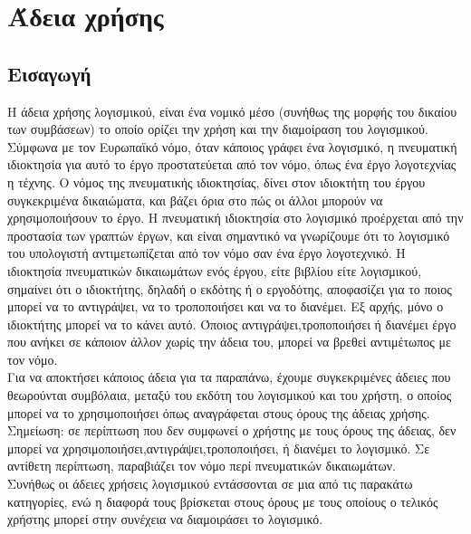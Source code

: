 %
%
%
%
%
\section{Άδεια χρήσης}
\subsection{Εισαγωγή}
Η άδεια χρήσης λογισμικού, είναι ένα νομικό μέσο (συνήθως της μορφής του δικαίου των συμβάσεων) το οποίο ορίζει την χρήση και την διαμοίραση του λογισμικού. Σύμφωνα με τον Ευρωπαϊκό νόμο, όταν κάποιος γράφει ένα λογισμικό, η πνευματική ιδιοκτησία για αυτό το έργο προστατεύεται από τον νόμο, όπως ένα έργο λογοτεχνίας η τέχνης. Ο νόμος της πνευματικής ιδιοκτησίας, δίνει στον ιδιοκτήτη του έργου συγκεκριμένα δικαιώματα, και βάζει όρια στο πώς οι άλλοι μπορούν να χρησιμοποιήσουν το έργο. Η πνευματική ιδιοκτησία στο λογισμικό προέρχεται από την προστασία των γραπτών έργων, και είναι σημαντικό να γνωρίζουμε ότι το λογισμικό του υπολογιστή αντιμετωπίζεται από τον νόμο σαν ένα έργο λογοτεχνικό. Η ιδιοκτησία πνευματικών δικαιωμάτων ενός έργου, είτε βιβλίου είτε λογισμικού, σημαίνει ότι ο ιδιοκτήτης, δηλαδή ο εκδότης ή ο εργοδότης, αποφασίζει για το ποιος μπορεί να το αντιγράψει, να το τροποποιήσει και να το διανέμει. Εξ αρχής, μόνο ο ιδιοκτήτης μπορεί να το κάνει αυτό.\cite{EUPL-guideline} Όποιος αντιγράψει,τροποποιήσει ή διανέμει έργο που ανήκει σε κάποιον άλλον χωρίς την άδεια του, μπορεί να βρεθεί αντιμέτωπος με τον νόμο. \\
Για να αποκτήσει κάποιος άδεια για τα παραπάνω, έχουμε συγκεκριμένες άδειες που θεωρούνται συμβόλαια, μεταξύ του εκδότη του λογισμικού και του χρήστη, ο οποίος μπορεί να το χρησιμοποιήσει όπως αναγράφεται στους όρους της άδειας χρήσης. Σημείωση: σε περίπτωση που δεν συμφωνεί ο χρήστης με τους όρους της άδειας, δεν μπορεί να χρησιμοποιήσει,αντιγράψει,τροποποιήσει, ή διανέμει το λογισμικό. Σε αντίθετη περίπτωση, παραβιάζει τον νόμο περί πνευματικών δικαιωμάτων. \\
Συνήθως οι άδειες χρήσεις λογισμικού εντάσσονται σε μια από τις παρακάτω κατηγορίες, ενώ η διαφορά τους βρίσκεται στους όρους με τους οποίους ο τελικός χρήστης μπορεί στην συνέχεια να διαμοιράσει το λογισμικό.
